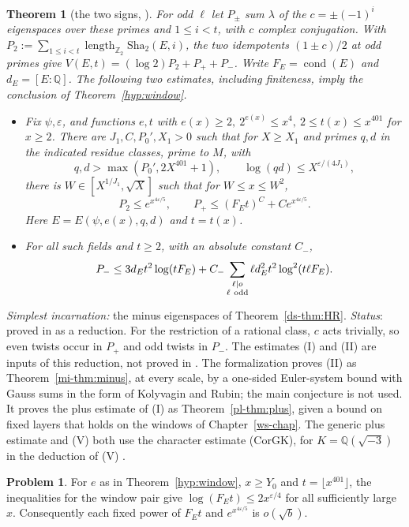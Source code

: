 \documentclass[reqno]{amsart}
\newcounter{chap}
\theoremstyle{definition}
\newtheorem{problem}{Problem}[section]
\theoremstyle{plain}
\newtheorem{theorem}{Theorem}[section]
\newcommand{\Z}{\mathbb Z}
\newcommand{\Q}{\mathbb Q}
\newcommand{\Sha}{\mathrm{Sha}}
\newcommand{\len}{\operatorname{length}}
\begin{document}
\begin{theorem}[the two signs, {\cite[Thm.~17.12]{Adr}}]\label{thm:signs}
For odd \(\ell\) let \(P_\pm\) sum \(\lambda\) of the \(c=\pm(-1)^i\) eigenspaces over these primes and \(1\le i<t\), with \(c\) complex conjugation.  With \(P_2:=\sum_{1\le i<t}\len_{\Z_2}\Sha_2(E,i)\), the two idempotents \((1\pm c)/2\) at odd primes give \(V(E,t)=(\log2)P_2+P_++P_-\).  Write \(F_E=\operatorname{cond}(E)\) and \(d_E=[E:\Q]\).  The following two estimates, including finiteness, imply the conclusion of Theorem~\ref{hyp:window}.
\begin{itemize}
\item[(I)] Fix \(\psi,\varepsilon\), and functions \(e,t\) with \(e(x)\ge2,\ 2^{e(x)}\le x^4,\ 2\le t(x)\le x^{401}\) for \(x\ge2\).  There are \(J_1,C,P_0',X_1>0\) such that for \(X\ge X_1\) and primes \(q,d\) in the indicated residue classes, prime to \(M\), with
\[
 q,d>\max(P_0',2X^{401}+1),\qquad \log(qd)\le X^{\varepsilon/(4J_1)},
\]
there is \(W\in[X^{1/J_1},\sqrt X]\) such that for \(W\le x\le W^2\),
\[
 P_2\le e^{x^{4\varepsilon/5}},\qquad P_+\le(F_Et)^C+C e^{x^{4\varepsilon/5}}.
\]
Here \(E=E(\psi,e(x),q,d)\) and \(t=t(x)\).
\item[(II)] For all such fields and \(t\ge2\), with an absolute constant \(C_-\),
\[
 P_-\le 3d_Et^2\log(tF_E)+C_-\sum_{\substack{\ell\mid o\\\ell\ {\rm odd}}}
          \ell d_E^2t^2\log^2(t\ell F_E).
\]
\end{itemize}
\end{theorem}
\noindent\emph{Simplest incarnation:} the minus eigenspaces of Theorem~\ref{ds-thm:HR}. \emph{Status}: proved in \cite{Adr} as a reduction.  For the restriction of a rational class, \(c\) acts trivially, so even twists occur in \(P_+\) and odd twists in \(P_-\).  The estimates (I) and (II) are inputs of this reduction, not proved in \cite{Adr}.  The formalization proves (II) as Theorem~\ref{mi-thm:minus}, at every scale, by a one-sided Euler-system bound with Gauss sums in the form of Kolyvagin and Rubin; the main conjecture is not used.  It proves the plus estimate of (I) as Theorem~\ref{pl-thm:plus}, given a bound on fixed layers that holds on the windows of Chapter~\ref{ws-chap}.  The generic plus estimate and (V) both use the character estimate (CorGK), for \(K=\Q(\sqrt{-3})\) in the deduction of (V) \cite[Props.~17.14, 17.19]{Adr}.

\begin{problem}\label{pr:conductor}
For \(e\) as in Theorem~\ref{hyp:window}, \(x\ge Y_0\) and \(t=\lfloor x^{401}\rfloor\), the inequalities for the window pair give \(\log(F_Et)\le 2x^{\varepsilon/4}\) for all sufficiently large \(x\).  Consequently each fixed power of \(F_Et\) and \(e^{x^{4\varepsilon/5}}\) is \(o(\sqrt b)\).
\end{problem}
\end{document}

